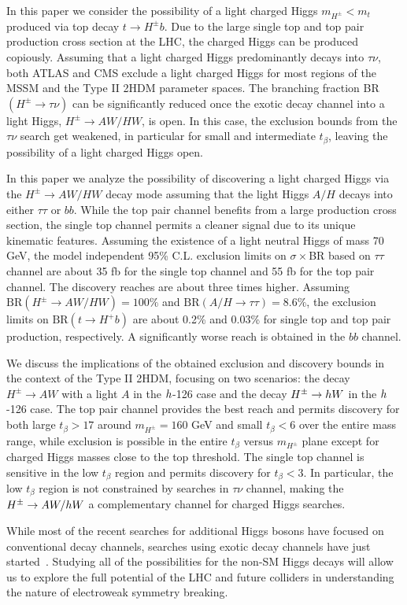 In this paper we consider the possibility of a light charged Higgs $m_{H^{\pm}} < m_t$ produced via top decay $t \rightarrow H^{\pm} b$. Due to the large single top and top pair production cross section at the LHC, the charged Higgs can be produced copiously. Assuming that a light charged Higgs predominantly decays into $\tau\nu$, both ATLAS and CMS exclude a light charged Higgs for most regions of the MSSM and the Type II 2HDM parameter spaces. The branching fraction BR$(H^{\pm} \rightarrow \tau\nu)$ can be significantly reduced once the exotic decay channel into a light Higgs, $H^{\pm} \rightarrow AW/HW$, is open. In this case, the exclusion bounds from the $\tau\nu$ search get weakened, in particular for small and intermediate $t_{\beta}$, leaving the possibility of a light charged Higgs open. 

In this paper we analyze the possibility of discovering a light charged Higgs via the $H^{\pm} \rightarrow AW/HW$ decay mode assuming that the light Higgs $A/H$ decays into either $\tau\tau$ or $bb$. While the top pair channel benefits from a large production cross section, the single top channel permits a cleaner signal due to its unique kinematic features. Assuming the existence of a light neutral Higgs of mass 70 GeV, the model independent 95\% C.L. exclusion limits on $\sigma\times$BR based on $\tau\tau$ channel are about 35 fb for the single top channel and 55 fb for the top pair channel. The discovery reaches are about three times higher. Assuming $\text{BR}(H^{\pm} \rightarrow AW/HW)=100\%$ and $\text{BR}(A/H \rightarrow \tau\tau)=8.6\%$, the exclusion limits on $\text{BR}(t \rightarrow H^+ b)$ are about 0.2\% and 0.03\% for single top and top pair production, respectively. A significantly worse reach is obtained in the $bb$ channel. 

We discuss the implications of the obtained exclusion and discovery bounds in the context of the Type II 2HDM, focusing on two scenarios: the decay $H^{\pm} \rightarrow AW$ with a light $A$ in the $h$-126 case and the decay $H^{\pm} \rightarrow h W$ in the $h$-126 case.  The top pair channel provides the best reach and permits discovery for both large $t_{\beta}>17$ around $m_{H^{\pm}}=160$ GeV and small $t_{\beta}<6$ over the entire mass range, while exclusion is possible in the entire $t_{\beta}$ versus $m_{H^{\pm}}$ plane except for charged Higgs masses close to the top threshold. The single top channel is sensitive in the low $t_{\beta}$ region and permits discovery for $t_{\beta}< 3$. In particular, the low $t_{\beta}$ region is not constrained by searches in $\tau\nu$ channel, making the $H^{\pm} \rightarrow AW/h W$ a complementary channel for charged Higgs searches.

While most of the recent searches for additional Higgs bosons have focused on conventional decay channels, searches using exotic decay channels have just started~\cite{Curtin:2013fra, Brownson:2013lka, Coleppa:2014hxa, Coleppa:2014cca,Li:2015lra,Dorsch:2014qja,Chen:2013emb,Chen:2014dma,Enberg:2014pua,CMS:2014yra,Aad:2015wra,CMS:2013eua}. Studying all of the possibilities for the non-SM Higgs decays will allow us to explore the full potential of the LHC and future colliders in understanding the nature of electroweak symmetry breaking. 
